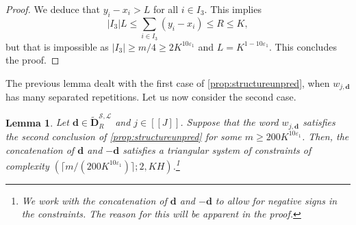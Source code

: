 \documentclass[11pt]{amsart}
\newtheorem{lemma}[theorem]{Lemma}
\theoremstyle{definition}
\renewcommand{\leq}{\leqslant}
\renewcommand{\geq}{\geqslant}
\newcommand{\sinterval}[1]{[\![#1]\!] }
\newcommand{\abs}[1]{\left|#1\right|}
\newcommand{\eps}{\varepsilon}
\renewcommand{\d}{\boldsymbol{d}}
\newcommand{\cstH}{\eps_1}
\newcommand{\cstm}{10\eps_1}
\newcommand{\boundelln}{\repK^{1-10\cstH}}
\newcommand{\lit}{\mathcal{L}}
\newcommand{\s}{\mathcal{S}}
\newcommand{\fancyD}{\mathbf{D}}
\newcommand{\Dnb}{\widetilde{\fancyD}^{\s,\lit}_{\!\tupsize}}
\newcommand{\elln}{L}
\newcommand{\repK}{K}
\newcommand{\newR}{\sinterval{J}}
\newcommand{\mm}{m}
\newcommand{\tupsize}{R}
\newcommand{\thisx}{x}
\newcommand{\thisy}{y}
\begin{document}
\begin{proof}
We deduce that $\thisy_i - \thisx_i>\elln$ for all $i \in I_3$. This implies
\begin{equation*}
	|I_3| \elln \leq \sum_{i \in I_3} (\thisy_i-\thisx_i) \leq \tupsize \leq \repK,
\end{equation*}
but that is impossible as $\abs{I_3} \geq \mm/4 \geq 2\repK^{\cstm}$ and $\elln = \boundelln$. This concludes the proof.
\end{proof}

The previous lemma dealt with the first case of \cref{prop:structureunpred}, when $w_{j,\d}$ has many separated repetitions. Let us now consider the second case.

\begin{lemma}
\label{lem:seprepstep3}
Let $\d \in \Dnb$ and $j\in \newR$. Suppose that the word $w_{j,\d}$ satisfies the second conclusion of \cref{prop:structureunpred} for some $\mm \geq 200\repK^{\cstm}$. Then, the concatenation of $\d$ and $-\d$ satisfies a triangular system of constraints of complexity $(\lceil \mm/(200\repK^{\cstm})\rceil ;2,\repK H)$.\footnote{We work with the concatenation of $\d$ and $-\d$ to allow for negative signs in the constraints. The reason for this will be apparent in the proof.}
\end{lemma}
\end{document}
